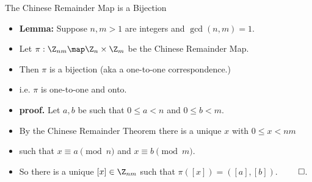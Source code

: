 \documentclass[handout]{beamer}
\begin{document}
\begin{frame}{The Chinese Remainder Map is a Bijection}

\begin{itemize}
  \item \textbf{Lemma:} Suppose $n,m >1$ are integers and $\gcd(n,m)=1$.
  \item Let $\pi:\Z_{nm} \map \Z_n\times \Z_m$ be the Chinese Remainder Map.
  \item Then $\pi$ is a bijection (aka a one-to-one correspondence.)
  \item i.e. $\pi$ is one-to-one and onto.
  \item \textbf{proof.} Let $a,b$ be such that $0\leq a < n$ and $0\leq b < m$.
  \item By the Chinese Remainder Theorem there is a unique $x$ with $0\leq x < nm$
  \item such that $x \equiv a \pmod n$ and $x\equiv b \pmod m$.
  \item So there is a unique $[x]\in\Z_{nm}$ such that $\pi([x]) = \left([a],[b]\right)$. $\qed$.
\end{itemize}

\end{frame}
\end{document}
